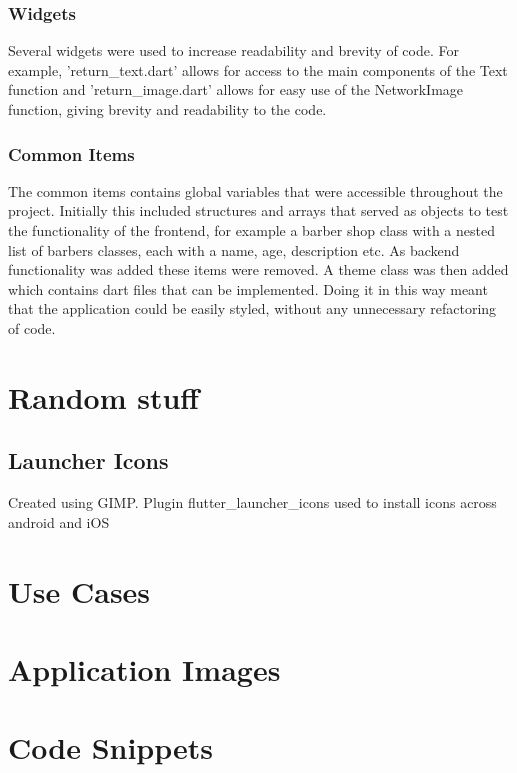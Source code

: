 \documentclass[12pt]{article}
\begin{document}
	\subsubsection{Widgets}
	Several widgets were used to increase readability and brevity of code. For example, 'return\_text.dart' allows for access to the main components of the Text function and 'return\_image.dart' allows for easy use of the NetworkImage function, giving brevity and readability to the code.
	
	\subsubsection{Common Items}
	The common items contains global variables that were accessible throughout the project. Initially this included structures and arrays that served as objects to test the functionality of the frontend, for example a barber shop class with a nested list of barbers classes, each with a name, age, description etc. As backend functionality was added these items were removed. A theme class was then added which contains dart files that can be implemented. Doing it in this way meant that the application could be easily styled, without any unnecessary refactoring of code.
	
	\section{Random stuff}
	\subsection{Launcher Icons}
	Created using GIMP. Plugin flutter\_launcher\_icons used to install icons across android and iOS
	
	
	
	\appendix
	\section{Use Cases}
	\section{Application Images}
	\section{Code Snippets}
	
\end{document}
